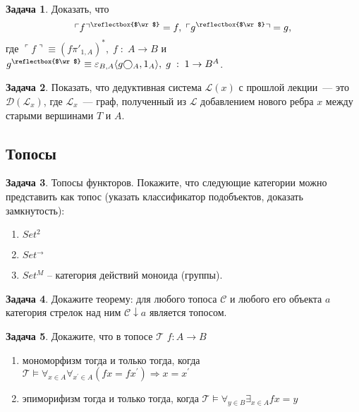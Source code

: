 \documentclass[10pt]{article}
\theoremstyle{definition}
\newtheorem{Pm}{Задача}[subsection]
\DeclareRobustCommand{\ArrowOf}{\text{\reflectbox{$\wr$}}}
\begin{document}
\begin{Pm}
    Доказать, что
    $$
        \ulcorner f \urcorner^\ArrowOf = f,\; \ulcorner g^\ArrowOf \urcorner = g\text{,}
    $$
    где $\ulcorner f \urcorner \equiv (f\pi'_{1,A})^*,\; f\; :\; A \rightarrow B$ и $g^\ArrowOf \equiv \varepsilon_{B,A} \langle g \bigcirc_A, 1_A \rangle,\; g\; :\; 1 \rightarrow B^A$.
\end{Pm}

\begin{Pm}
    Показать, что дедуктивная система $\mathscr{L}(x)$ с прошлой лекции~--- это $\mathscr{D}(\mathscr{L}_x)$, где $\mathscr{L}_x$~--- граф, полученный из $\mathscr{L}$ добавлением нового ребра $x$ между старыми вершинами $T$ и $A$.
\end{Pm}

\subsection{Топосы}
\begin{Pm}
    Топосы функторов. Покажите, что следующие категории можно представить как топос (указать классификатор подобъектов, доказать замкнутость):
    \begin{enumerate}
        \item $Set^2$
        \item $Set^\rightarrow$
        \item $Set^M$ -- категория действий моноида (группы).
    \end{enumerate}
\end{Pm}

\begin{Pm}
    Докажите теорему:
    для любого топоса $\mathcal{C}$ и любого его объекта $a$ категория стрелок над ним $\mathcal{C}\downarrow a$ является топосом.
\end{Pm}

\begin{Pm}
    Докажите, что в топосе $\mathcal{T}$ $f:A \to B$
    \begin{enumerate}
        \item мономорфизм тогда и только тогда, когда $\mathcal{T} \vDash \forall_{x\in A}\forall_{x^\prime \in A} (f x = f x^\prime) \Rightarrow x = x^\prime$
        \item эпиморифизм тогда и только тогда, когда $\mathcal{T} \vDash \forall_{y\in B}\exists_{x\in A}f x = y$
    \end{enumerate}
\end{Pm}
\end{document}
